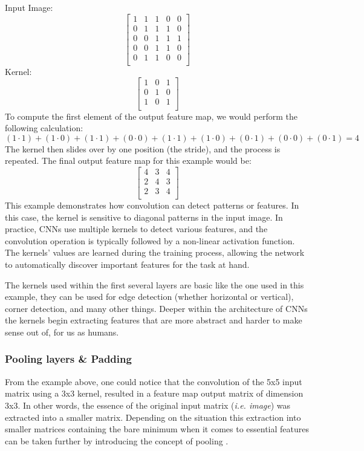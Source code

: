\noindent Input Image:
\[
\begin{bmatrix}
1 & 1 & 1 & 0 & 0 \\
0 & 1 & 1 & 1 & 0 \\
0 & 0 & 1 & 1 & 1 \\
0 & 0 & 1 & 1 & 0 \\
0 & 1 & 1 & 0 & 0 \\
\end{bmatrix}
\]
Kernel:
\[
\begin{bmatrix}
1 & 0 & 1 \\
0 & 1 & 0 \\
1 & 0 & 1 \\
\end{bmatrix}
\]
To compute the first element of the output feature map, we would perform the following calculation:
\[
(1 \cdot 1) + (1 \cdot 0) + (1 \cdot 1) + (0 \cdot 0) + (1 \cdot 1) + (1 \cdot 0) + (0 \cdot 1) + (0 \cdot 0) + (0 \cdot 1) = 4
\]
The kernel then slides over by one position (the stride), and the process is repeated. The final output feature map for this example would be:
\[
\begin{bmatrix}
4 & 3 & 4 \\
2 & 4 & 3 \\
2 & 3 & 4\\
\end{bmatrix}
\]
This example demonstrates how convolution can detect patterns or features. In this case, the kernel is sensitive to diagonal patterns in the input image.
In practice, CNNs use multiple kernels to detect various features, and the convolution operation is typically followed by a non-linear activation function. The kernels' values are learned during the training process, allowing the network to automatically discover important features for the task at hand.

The kernels used within the first several layers are basic like the one used in this example, they can be used for edge detection (whether horizontal or vertical), corner detection, and many other things. Deeper within the architecture of CNNs the kernels begin extracting features that are more abstract and harder to make sense out of, for us as humans.

\subsubsection{Pooling layers \& Padding}
From the example above, one could notice that the convolution of the 5x5 input matrix using a 3x3 kernel, resulted in a feature map output matrix of dimension 3x3. In other words, the essence of the original input matrix (\textit{i.e. image}) was extracted into a smaller matrix. Depending on the situation this extraction into smaller matrices containing the bare minimum when it comes to essential features can be taken further by introducing the concept of pooling \cite{lecun2015deep}.

